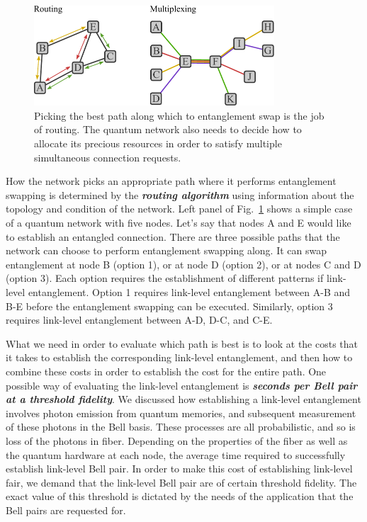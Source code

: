 \begin{figure}[t]
    \centering
    \includegraphics[width=0.8\textwidth]{lesson12/12-5_routing_multiplexing.pdf}
    \caption[Routing and multiplexing]{Picking the best path along which to entanglement swap is the job of routing. The quantum network also needs to decide how to allocate its precious resources in order to satisfy multiple simultaneous connection requests.}
    \label{fig:12-5_routing_multiplexing}
\end{figure}

How the network picks an appropriate path where it performs entanglement swapping is determined by the \textit{\textbf{routing algorithm}} using information about the topology and condition of the network.
Left panel of Fig.~\ref{fig:12-5_routing_multiplexing} shows a simple case of a quantum network with five nodes.
Let's say that nodes A and E would like to establish an entangled connection.
There are three possible paths that the network can choose to perform entanglement swapping along.
It can swap entanglement at node B (option 1), or at node D (option 2), or at nodes C and D (option 3).
Each option requires the establishment of different patterns if link-level entanglement.
Option 1 requires link-level entanglement between A-B and B-E before the entanglement swapping can be executed.
Similarly, option 3 requires link-level entanglement between A-D, D-C, and C-E.

What we need in order to evaluate which path is best is to look at the costs that it takes to establish the corresponding link-level entanglement, and then how to combine these costs in order to establish the cost for the entire path.
One possible way of evaluating the link-level entanglement is \textit{\textbf{seconds per Bell pair at a threshold fidelity}}.
We discussed how establishing a link-level entanglement involves photon emission from quantum memories, and subsequent measurement of these photons in the Bell basis.
These processes are all probabilistic, and so is loss of the photons in fiber.
Depending on the properties of the fiber as well as the quantum hardware at each node, the average time required to successfully establish link-level Bell pair.
In order to make this cost of establishing link-level fair, we demand that the link-level Bell pair are of certain threshold fidelity.
The exact value of this threshold is dictated by the needs of the application that the Bell pairs are requested for.

